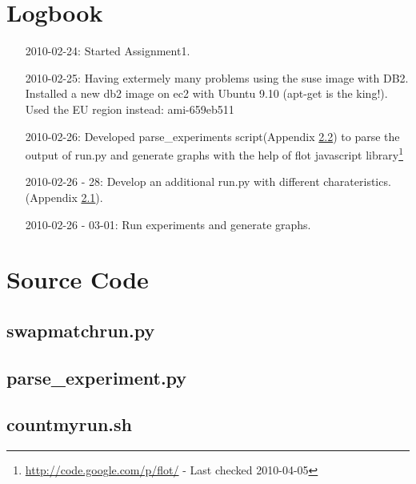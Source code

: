 \clearpage
\chapter{Logbook}
\begin{itemize}
  \item[2010-02-24:] Started Assignment1.
  \item[2010-02-25:] Having extermely many problems using the suse image with
    DB2. Installed a new db2 image on ec2 with Ubuntu 9.10 (apt-get is the
    king!). Used the EU region instead: ami-659eb511
  \item[2010-02-26:] Developed parse\_experiments script(Appendix
    \ref{app:parseexperiment.py}) to parse the output of run.py and generate
    graphs with the help of flot javascript
    library\footnote{\url{http://code.google.com/p/flot/} - Last checked
    2010-04-05}
  \item[2010-02-26 - 28:] Develop an additional run.py with different
    charateristics.(Appendix \ref{app:swmr.py}).
  \item[2010-02-26 - 03-01:] Run experiments and generate graphs.
\end{itemize}
\newpage
\appendix
\chapter{Source Code}

\section{swapmatchrun.py}\label{app:swmr.py}


\section{parse\_experiment.py}\label{app:parseexperiment.py}



\section{countmyrun.sh}\label{app:countmyrun.sh}



